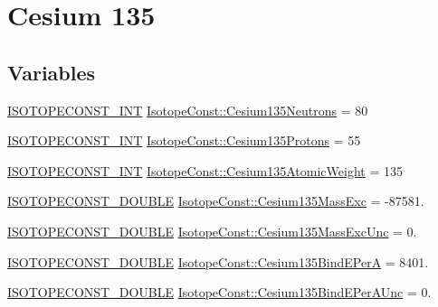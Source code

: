 \hypertarget{group___isotope_const-_cesium-_cs135}{}\section{Cesium 135}
\label{group___isotope_const-_cesium-_cs135}
\subsection*{Variables}
\begin{DoxyCompactItemize}
\item 
\mbox{\hyperlink{group___isotope_const-_macros_ga5f18360b3e99483a35c32d789e62621c}{I\+S\+O\+T\+O\+P\+E\+C\+O\+N\+S\+T\+\_\+\+I\+NT}} \mbox{\hyperlink{group___isotope_const-_cesium-_cs135_ga402e012bdfe3060f4edd015c30383f97}{Isotope\+Const\+::\+Cesium135\+Neutrons}} = 80
\item 
\mbox{\hyperlink{group___isotope_const-_macros_ga5f18360b3e99483a35c32d789e62621c}{I\+S\+O\+T\+O\+P\+E\+C\+O\+N\+S\+T\+\_\+\+I\+NT}} \mbox{\hyperlink{group___isotope_const-_cesium-_cs135_gae56f375f06b4cc5f98a21fa10de5e8ba}{Isotope\+Const\+::\+Cesium135\+Protons}} = 55
\item 
\mbox{\hyperlink{group___isotope_const-_macros_ga5f18360b3e99483a35c32d789e62621c}{I\+S\+O\+T\+O\+P\+E\+C\+O\+N\+S\+T\+\_\+\+I\+NT}} \mbox{\hyperlink{group___isotope_const-_cesium-_cs135_ga22a2e87542f11d53d70c402f537568b9}{Isotope\+Const\+::\+Cesium135\+Atomic\+Weight}} = 135
\item 
\mbox{\hyperlink{group___isotope_const-_macros_ga8f45a7272ce02c0b4c65c44636ed719a}{I\+S\+O\+T\+O\+P\+E\+C\+O\+N\+S\+T\+\_\+\+D\+O\+U\+B\+LE}} \mbox{\hyperlink{group___isotope_const-_cesium-_cs135_ga57dd2d784c6c3ba70285c4717b03e5d4}{Isotope\+Const\+::\+Cesium135\+Mass\+Exc}} = -\/87581.
\item 
\mbox{\hyperlink{group___isotope_const-_macros_ga8f45a7272ce02c0b4c65c44636ed719a}{I\+S\+O\+T\+O\+P\+E\+C\+O\+N\+S\+T\+\_\+\+D\+O\+U\+B\+LE}} \mbox{\hyperlink{group___isotope_const-_cesium-_cs135_gae63b743057a56f4584e5c94358682207}{Isotope\+Const\+::\+Cesium135\+Mass\+Exc\+Unc}} = 0.
\item 
\mbox{\hyperlink{group___isotope_const-_macros_ga8f45a7272ce02c0b4c65c44636ed719a}{I\+S\+O\+T\+O\+P\+E\+C\+O\+N\+S\+T\+\_\+\+D\+O\+U\+B\+LE}} \mbox{\hyperlink{group___isotope_const-_cesium-_cs135_ga9d44af355926418ac28a0dbdb4846b73}{Isotope\+Const\+::\+Cesium135\+Bind\+E\+PerA}} = 8401.
\item 
\mbox{\hyperlink{group___isotope_const-_macros_ga8f45a7272ce02c0b4c65c44636ed719a}{I\+S\+O\+T\+O\+P\+E\+C\+O\+N\+S\+T\+\_\+\+D\+O\+U\+B\+LE}} \mbox{\hyperlink{group___isotope_const-_cesium-_cs135_ga4b145b4ce18961ef3e150d643a212f1d}{Isotope\+Const\+::\+Cesium135\+Bind\+E\+Per\+A\+Unc}} = 0.

\end{DoxyCompactItemize}
